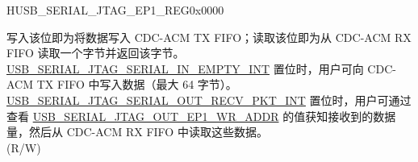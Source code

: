 \begin{register}{H}{USB\_SERIAL\_JTAG\_EP1\_REG}{0x0000}\label{regdesc:USBSERIALJTAGEP1REG}
    \regnewline%
    \begin{regdesc}\begin{reglist}
    \label{fielddesc:USBSERIALJTAGRDWRBYTE}\item [USB\_SERIAL\_JTAG\_RDWR\_BYTE] 写入该位即为将数据写入 CDC-ACM TX FIFO；读取该位即为从 CDC-ACM RX FIFO 读取一个字节并返回该字节。\\
    \hyperref[int:USBSERIALJTAGSERIALINEMPTYINT]{USB\_SERIAL\_JTAG\_SERIAL\_IN\_EMPTY\_INT} 置位时，用户可向 CDC-ACM TX FIFO 中写入数据（最大 64 字节）。\\
    \hyperref[int:USBSERIALJTAGSERIALOUTRECVPKTINT]{USB\_SERIAL\_JTAG\_SERIAL\_OUT\_RECV\_PKT\_INT} 置位时，用户可通过查看 \hyperref[fielddesc:USBSERIALJTAGOUTEP1WRADDR]{USB\_SERIAL\_JTAG\_OUT\_EP1\_WR\_ADDR} 的值获知接收到的数据量，然后从 CDC-ACM RX FIFO 中读取这些数据。\\
    (R/W)
    \end{reglist}\end{regdesc}
    \end{register}


